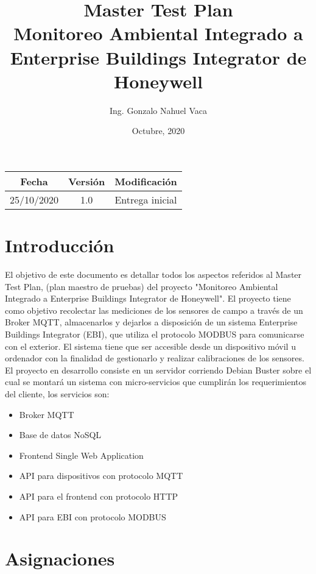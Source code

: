 \documentclass[
11pt,
spanish,
singlespacing,
parskip, 
headsepline,
a4paper
]{article}
\title{Master Test Plan \\ Monitoreo Ambiental Integrado a Enterprise Buildings Integrator de Honeywell}
\author{Ing. Gonzalo Nahuel Vaca}
\date{Octubre, 2020}
\begin{document}
\begin{titlepage}
\maketitle

\begin{table}[b]
\centering
\begin{tabular}{|c|c|c|}
\hline
Fecha & Versión & Modificación \\ \hline
25/10/2020 & 1.0 & Entrega inicial \\ \hline
\end{tabular}
\end{table}
\thispagestyle{empty}
\end{titlepage}

\tableofcontents
\newpage

\section{Introducción}
\label{sec:introduccion}
El objetivo de este documento es detallar todos los aspectos referidos al Master Test Plan, (plan maestro de pruebas) del proyecto "Monitoreo Ambiental Integrado a Enterprise Buildings Integrator de Honeywell".
El proyecto tiene como objetivo recolectar las mediciones de los sensores de campo a través de un Broker MQTT, almacenarlos y dejarlos a disposición de un sistema Enterprise Buildings Integrator (EBI), que utiliza el protocolo MODBUS para comunicarse con el exterior.
El sistema tiene que ser accesible desde un dispositivo móvil u ordenador con la finalidad de gestionarlo y realizar calibraciones de los sensores. \\
El proyecto en desarrollo consiste en un servidor corriendo Debian Buster sobre el cual se montará un sistema con micro-servicios que cumplirán los requerimientos del cliente, los servicios son:

\begin{itemize}
\item Broker MQTT
\item Base de datos NoSQL
\item Frontend Single Web Application
\item API para dispositivos con protocolo MQTT
\item API para el frontend con protocolo HTTP
\item API para EBI con protocolo MODBUS
\end{itemize}

\section{Asignaciones}
\end{document}
